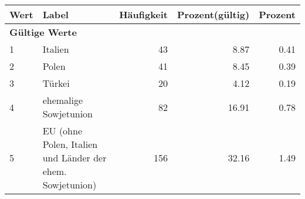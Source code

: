      \begin{longtable}{lXrrr}
     \toprule
     \textbf{Wert} & \textbf{Label} & \textbf{Häufigkeit} & \textbf{Prozent(gültig)} & \textbf{Prozent} \\
     \endhead
     \midrule
     \multicolumn{5}{l}{\textbf{Gültige Werte}}\\

     1 &
     \multicolumn{1}{X}{ Italien   } &


       \num{43} &
       \num[round-mode=places,round-precision=2]{8,87} &
         \num[round-mode=places,round-precision=2]{0,41} \\

     2 &
     \multicolumn{1}{X}{ Polen   } &


       \num{41} &
       \num[round-mode=places,round-precision=2]{8,45} &
         \num[round-mode=places,round-precision=2]{0,39} \\

     3 &
     \multicolumn{1}{X}{ Türkei   } &


       \num{20} &
       \num[round-mode=places,round-precision=2]{4,12} &
         \num[round-mode=places,round-precision=2]{0,19} \\

     4 &
     \multicolumn{1}{X}{ ehemalige Sowjetunion   } &


       \num{82} &
       \num[round-mode=places,round-precision=2]{16,91} &
         \num[round-mode=places,round-precision=2]{0,78} \\

     5 &
     \multicolumn{1}{X}{ EU (ohne Polen, Italien und Länder der ehem. Sowjetunion)   } &


       \num{156} &
       \num[round-mode=places,round-precision=2]{32,16} &
         \num[round-mode=places,round-precision=2]{1,49} \\


\end{longtable}
